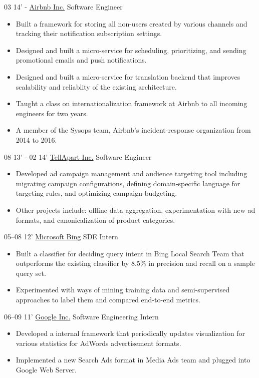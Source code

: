 \documentclass[]{patyoon-cv}
\begin{document}
\begin{entrylist}
  \entry
  {03 14' - }
  {\href{https://www.airbnb.com/}{Airbnb Inc.}}
  {Software Engineer}
  {\begin{itemize}
    \item Built a framework for storing all non-users created by various channels and tracking their notification subscription settings.
    \item Designed and built a micro-service for scheduling, prioritizing, and sending promotional emails and push notifications.
    \item Designed and built a micro-service for translation backend that improves scalability and reliablity of the existing architecture.
    \item Taught a class on internationalization framework at Airbnb to all incoming engineers for two years.
    \item A member of the Sysops team, Airbnb's incident-response organization from 2014 to 2016.
    \end{itemize}
  }
  \entry
  {08 13' - 02 14'}
  {\href{https://tellapart.com/}{TellApart Inc.}}
  {Software Engineer}
  {\begin{itemize}
    \item Developed ad campaign management and audience targeting tool including migrating campaign configurations, defining domain-specific language for targeting rules, and optimizing campaign budgeting.
    \item Other projects include: offline data aggregation, experimentation with new ad formats, and canonicalization of product categories.
    \end{itemize}
  }
  \entry
  {05–08 12'}
  {\href{http://bing.com/}{Microsoft Bing}}
  {SDE Intern}
  {\begin{itemize}
    \item Built a classifier for deciding query intent in Bing Local Search Team that outperforms the existing classifier by 8.5\% in precision and recall on a sample query set.
    \item Experimented with ways of mining training data and semi-supervised approaches to label them and compared end-to-end metrics.
    \end{itemize}}
  \entry
  {06–09 11'}
  {\href{http://www.google.com}{Google Inc.}}
  {Software Engineering Intern}
  {\begin{itemize}
    \item Developed a internal framework that periodically updates visualization for various statistics for AdWords advertisement formats.
    \item Implemented a new Search Ads format in Media Ads team and plugged into Google Web Server.
    \end{itemize}}
\end{entrylist}
\end{document}
